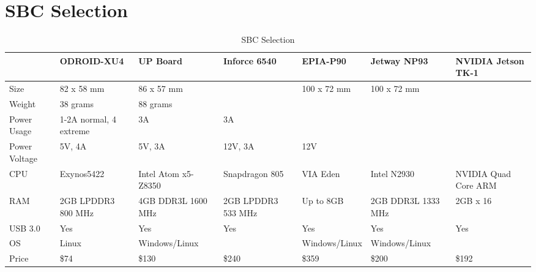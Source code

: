\section{SBC Selection}
\begin{table}[ht]
\caption{SBC Selection}
\label{table:sbc_selection}
\centering
\begin{tabular}{|l|l|l|l|l|l|l|}
    \hline              & ODROID-XU4                & UP Board              & Inforce 6540      & EPIA-P90       & Jetway NP93       & NVIDIA Jetson TK-1  \\ \hline
    Size                & 82 x 58 mm                & 86 x 57 mm            &                   & 100 x 72 mm    & 100 x 72 mm       &                     \\
    Weight              & 38 grams                  & 88 grams              &                   &                &                   &                     \\
    Power Usage         & 1-2A normal, 4 extreme    & 3A                    & 3A                &                &                   &                     \\
    Power Voltage       & 5V, 4A                    & 5V, 3A                & 12V, 3A           & 12V            &                   &                     \\
    CPU                 & Exynos5422                & Intel Atom x5-Z8350   & Snapdragon 805    & VIA Eden       & Intel N2930       & NVIDIA Quad Core ARM\\
    RAM                 & 2GB LPDDR3 800 MHz        & 4GB DDR3L 1600 MHz    & 2GB LPDDR3 533 MHz& Up to 8GB      & 2GB DDR3L 1333 MHz& 2GB x 16            \\
    USB 3.0             & Yes                       & Yes                   & Yes               & Yes            & Yes               & Yes                 \\
    OS                  & Linux                     & Windows/Linux         &                   & Windows/Linux  & Windows/Linux     &                     \\
    Price               & \$74                      & \$130                 & \$240             & \$359          & \$200             & \$192               \\ \hline
\end{tabular}
\end{table} \par

